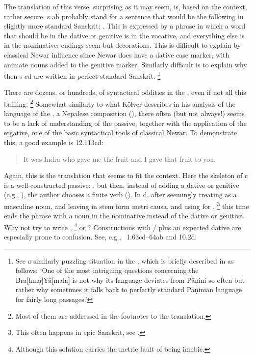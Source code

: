 \noindent            
The translation of this verse, surprising as it may seem, is, based on the
context, rather secure. s ab probably stand for a sentence that would
be the following in slightly more standard Sanskrit:
.
This is expressed by a phrase in which a word that should be 
in the dative or genitive  is in the vocative, and  
everything else is in the nominative: endings seem but
decorations. This is difficult to explain by classical Newar influence since Newar
does have a dative case marker, with animate nouns added to the genitive
marker. Similarly difficult is to explain why then s cd
are written in perfect standard Sanskrit.%
		\footnote{See a similarly puzzling situation in the \BraYa, 
						which is briefly described in  as follows:
		`One of the most intriguing questions concerning the Bra[hma]Yā[mala] 
		is not why its language deviates from Pāṇini so often 
		but rather why sometimes it falls back to perfectly standard 
		Pāṇinian language for fairly long passages.'}

There are dozens, or hundreds, of syntactical oddities in the \VSS,
even if not all this baffling.%
		\footnote{Most of them are addressed in the footnotes 
									to the translation.}
Somewhat similarly to what Kölver describes in 
his analysis of the language of the \SvayP, a Nepalese composition (),
there often (but not always!) seems to be a lack of understanding of the
passive, together with the application of the ergative, one of the
basic syntactical tools of classical Newar. To demonstrate this, a good 
example is 12.113cd:

\begin{quote}

It was Indra who gave me the fruit and I gave that fruit to you.
\end{quote}

\noindent
Again, this is the translation that seems to fit the context. 
Here the skeleton of  c is a well-constructed passive:
, but then, instead of adding a dative or 
genitive (e.g., ), the author chooses 
a finite verb (). In  d, after seemingly 
treating  as a masculine noun, and leaving
 in stem form metri causa, and using  for ,%
		\footnote{This often happens in epic Sanskrit, see 
			.}
this time ends the phrase with a noun in the nominative  instead of
the dative or genitive. Why not try to write ,%
		\footnote{Although this solution carries the metric fault of 
								being iambic.}
or ?
Constructions with / plus an expected dative 
are especially prone to confusion. See, e.g., \VSS\ 1.63cd--64ab and 
10.2d:

